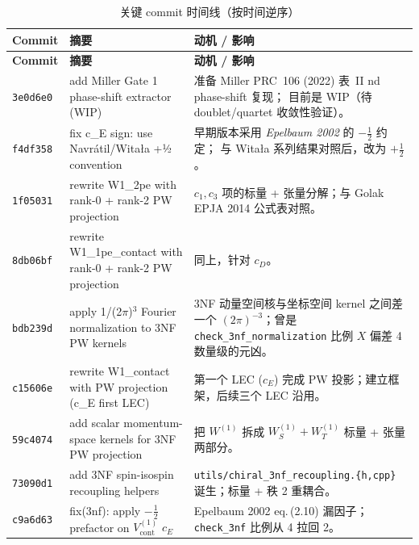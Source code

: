 \begin{longtable}{@{}p{16mm}p{52mm}p{72mm}@{}}
\caption{关键 commit 时间线（按时间逆序）}
\label{tab:ch19:timeline}\\
\toprule
\textbf{Commit} & \textbf{摘要} & \textbf{动机 / 影响}\\
\midrule
\endfirsthead
\toprule
\textbf{Commit} & \textbf{摘要} & \textbf{动机 / 影响}\\
\midrule
\endhead
\bottomrule
\endfoot

\texttt{3e0d6e0} & add Miller Gate 1 phase-shift extractor (WIP)
& 准备 Miller PRC~106 (2022) 表~II nd phase-shift 复现；
  目前是 WIP（待 doublet/quartet 收敛性验证）。\\

\texttt{f4df358} & fix c\_E sign: use Navrátil/Witała +½ convention
& 早期版本采用 \emph{Epelbaum 2002} 的 $-\tfrac12$ 约定；
  与 Witała 系列结果对照后，改为 $+\tfrac12$。\\

\texttt{1f05031} & rewrite W1\_2pe with rank-0 + rank-2 PW projection
& $c_1, c_3$ 项的标量 + 张量分解；与 Golak EPJA 2014 公式表对照。\\

\texttt{8db06bf} & rewrite W1\_1pe\_contact with rank-0 + rank-2 PW projection
& 同上，针对 $c_D$。\\

\texttt{bdb239d} & apply 1/(2$\pi$)$^3$ Fourier normalization to 3NF PW kernels
& 3NF 动量空间核与坐标空间 kernel 之间差一个 $(2\pi)^{-3}$；曾是
  \texttt{check\_3nf\_normalization} 比例 $X$ 偏差 4 数量级的元凶。\\

\texttt{c15606e} & rewrite W1\_contact with PW projection (c\_E first LEC)
& 第一个 LEC ($c_E$) 完成 PW 投影；建立框架，后续三个 LEC 沿用。\\

\texttt{59c4074} & add scalar momentum-space kernels for 3NF PW projection
& 把 $W^{(1)}$ 拆成 $W^{(1)}_S + W^{(1)}_T$ 标量 + 张量两部分。\\

\texttt{73090d1} & add 3NF spin-isospin recoupling helpers
& \texttt{utils/chiral\_3nf\_recoupling.\{h,cpp\}} 诞生；标量 + 秩 2 重耦合。\\

\texttt{c9a6d63} & fix(3nf): apply $-\tfrac12$ prefactor on $V^{(1)}_{\text{cont}}$ $c_E$
& Epelbaum 2002 eq.\,(2.10) 漏因子；\texttt{check\_3nf} 比例从 4 拉回 2。\\


\end{longtable}
